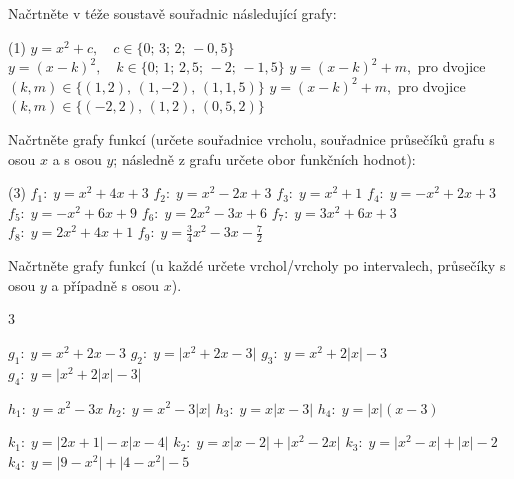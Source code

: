 \documentclass[12pt,a4paper]{article}
\begin{document}
\begin{exercise}
Načrtněte v téže soustavě souřadnic následující grafy:

\begin{tasks}(1)
  \task \(y=x^2+c,\quad c\in\{0;\,3;\,2;\,-0{,}5\}\)
  \task \(y=(x-k)^2,\quad k\in\{0;\,1;\,2{,}5;\,-2;\,-1{,}5\}\)
  \task \(y=(x-k)^2+m,\) pro dvojice \((k,m)\in\{(1,2),\,(1,-2),\,(1,1{,}5)\}\)
  \task \(y=(x-k)^2+m,\) pro dvojice \((k,m)\in\{(-2,2),\,(1,2),\,(0{,}5,2)\}\)
\end{tasks}
\end{exercise}

\begin{exercise}
Načrtněte grafy funkcí (určete souřadnice vrcholu, souřadnice průsečíků grafu s osou $x$ a s osou $y$; následně z grafu určete obor funkčních hodnot):

\begin{tasks}(3)
  \task $f_1:\; y = x^2 + 4x + 3$
  \task $f_2:\; y = x^2 - 2x + 3$
  \task $f_3:\; y = x^2 + 1$
  \task $f_4:\; y = -x^2 + 2x + 3$
  \task $f_5:\; y = -x^2 + 6x + 9$
  \task $f_6:\; y = 2x^2 - 3x + 6$
  \task $f_7:\; y = 3x^2 + 6x + 3$
  \task $f_8:\; y = 2x^2 + 4x + 1$
  \task $f_9:\; y = \tfrac{3}{4}x^2 - 3x - \tfrac{7}{2}$
\end{tasks}
\end{exercise}

\newpage
\begin{exercise}
Načrtněte grafy funkcí (u každé určete vrchol/vrcholy po intervalech, průsečíky s osou $y$ a případně s osou $x$).

\begin{multicols}{3}

\begin{tasks}
  \task $g_1:\; y = x^2 + 2x - 3$
  \task $g_2:\; y = \lvert x^2 + 2x - 3\rvert$
  \task $g_3:\; y = x^2 + 2\lvert x\rvert - 3$
  \task $g_4:\; y = \big\lvert x^2 + 2\lvert x\rvert - 3\big\rvert$
\end{tasks}

\columnbreak

\begin{tasks}
  \task $h_1:\; y = x^2 - 3x$
  \task $h_2:\; y = x^2 - 3\lvert x\rvert$
  \task $h_3:\; y = x\lvert x - 3\rvert$
  \task $h_4:\; y = \lvert x\rvert (x - 3)$
\end{tasks}

\columnbreak

\begin{tasks}
  \task \mbox{$k_1:\; y = \lvert 2x + 1\rvert - x\lvert x - 4\rvert$}
  \task \mbox{$k_2:\; y = x\lvert x - 2\rvert + \lvert x^2 - 2x\rvert$}
  \task \mbox{$k_3:\; y = \lvert x^2 - x\rvert + \lvert x\rvert - 2$}
  \task \mbox{$k_4:\; y = \lvert 9 - x^2\rvert + \lvert 4 - x^2\rvert - 5$}
\end{tasks}

\end{multicols}
\end{exercise}
\end{document}
